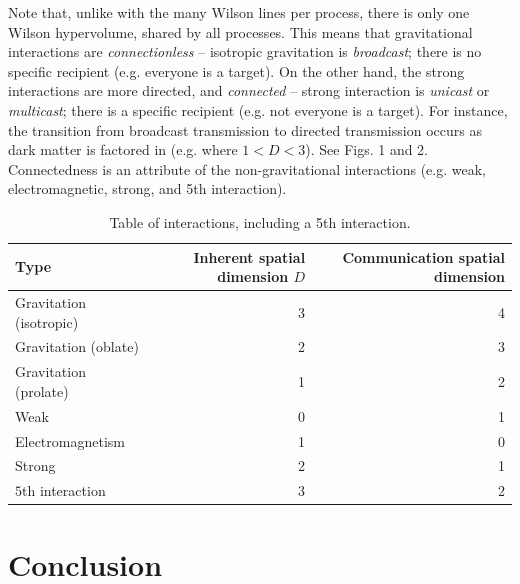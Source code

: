 \documentclass[12pt]{article}
\begin{document}
Note that, unlike with the many Wilson lines per process, there is only one Wilson hypervolume, shared by all processes.
This means that gravitational interactions are {\textit{connectionless}} -- isotropic gravitation is {\textit{broadcast}}; there is no specific recipient (e.g. everyone is a target).
On the other hand, the strong interactions are more directed, and {\textit{connected}} -- strong interaction is {\textit{unicast}} or {\textit{multicast}}; there is a specific recipient (e.g. not everyone is a target).
For instance, the transition from broadcast transmission to directed transmission occurs as dark matter is factored in (e.g. where $1 < D < 3$).
See Figs. 1 and 2.
Connectedness is an attribute of the non-gravitational interactions (e.g. weak, electromagnetic, strong, and 5th interaction).




\begin{table}
\caption{Table of interactions, including a 5th interaction.}
\begin{center}
\begin{tabular}{| l | r | r |}
  \hline
  Type & Inherent spatial dimension $D$ & Communication spatial dimension \\
\hline
\hline


Gravitation (isotropic) & 3  & 4\\

\rowcolor{Gray}
Gravitation (oblate) & 2 & 3\\

Gravitation (prolate) & 1 & 2\\

\rowcolor{Gray}
Weak & 0 & 1\\

Electromagnetism & 1 & 0 \\

\rowcolor{Gray}
Strong & 2 & 1\\

$5$th interaction & 3 & 2 \\
  \hline
\end{tabular}
\end{center}
\end{table}




\section{Conclusion}
\end{document}

